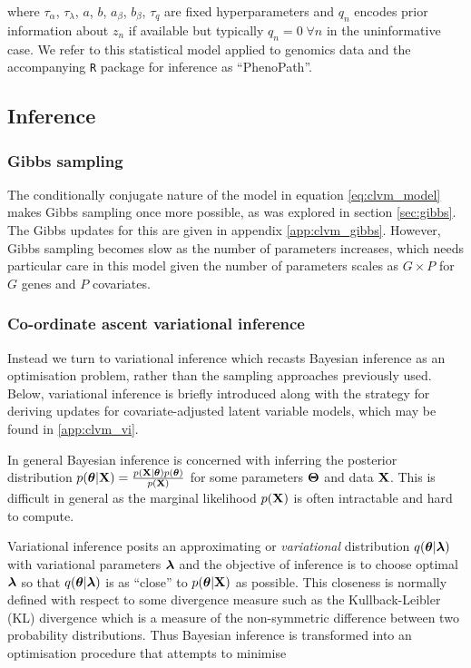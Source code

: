 where $\tau_\alpha$, $\tau_\lambda$, $a$, $b$, $a_\beta$, $b_\beta$, $\tau_q$ are fixed hyperparameters and $q_n$ encodes prior information about $z_n$ if available but typically $q_n = 0 \; \forall n$ in the uninformative case. We refer to this statistical model applied to genomics data and the accompanying \texttt{R} package for inference as ``PhenoPath''.



\subsection{Inference}

\subsubsection{Gibbs sampling}

The conditionally conjugate nature of the model in equation \ref{eq:clvm_model} makes Gibbs sampling once more possible, as was explored in section \ref{sec:gibbs}. The Gibbs updates for this are given in appendix \ref{app:clvm_gibbs}. However, Gibbs sampling becomes slow as the number of parameters increases, which needs particular care in this model given the number of parameters scales as $G \times P$ for $G$ genes and $P$ covariates.

\subsubsection{Co-ordinate ascent variational inference}

Instead we turn to variational inference which recasts Bayesian inference as an optimisation problem, rather than the sampling approaches previously used. Below, variational inference is briefly introduced along with the strategy for deriving updates for covariate-adjusted latent variable models, which may be found in \ref{app:clvm_vi}.

In general Bayesian inference is concerned with inferring the posterior distribution $p(\bm{\theta} | \mathbf{X}) = \frac{p(\mathbf{X} | \bm{\theta}) p(\bm{\theta})}{p(\mathbf{X})}$ for some parameters $\bm{\Theta}$ and data $\mathbf{X}$. This is difficult in general as the marginal likelihood $p(\mathbf{X})$ is often intractable and hard to compute.

Variational inference posits an approximating or \emph{variational} distribution $q(\bm{\theta} | \bm{\lambda})$ with variational parameters $\bm{\lambda}$ and the objective of inference is to choose optimal $\bm{\lambda}$ so that $q(\bm{\theta} | \bm{\lambda})$ is as ``close'' to $p(\bm{\theta} | \mathbf{X})$ as possible. This closeness is normally defined with respect to some divergence measure such as the Kullback-Leibler (KL) divergence which is a measure of the non-symmetric difference between two probability distributions. Thus Bayesian inference is transformed into an optimisation procedure that attempts to minimise

